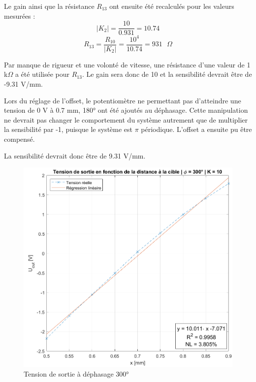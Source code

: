 Le gain ainsi que la résistance $R_{13}$ ont ensuite été recalculés pour les valeurs mesurées :
\begin{equation*}
    |K_2| = \frac{10}{0.931} = 10.74
\end{equation*}
\begin{equation*}
    R_{13} = \frac{R_{10}}{|K_2|}= \frac{10^4}{10.74}= 931\text{ }\Omega
\end{equation*}

Par manque de rigueur et une volonté de vitesse, une résistance d'une valeur de 1 k$\Omega$
a été utilisée pour $R_{13}$. Le gain sera donc de 10 et la sensibilité devrait être de -9.31 V/mm.
\vspace{0.2cm}

Lors du réglage de l'offset, le potentiomètre ne permettant pas d'atteindre une tension de 0 V à
0.7 mm, 180° ont été ajoutés au déphasage. Cette manipulation ne devrait pas changer le comportement
du système autrement que de multiplier la sensibilité par -1, puisque le système est $\pi$ périodique.
L'offset a ensuite pu être compensé.
\vspace{0.2cm}

La sensibilité devrait donc être de 9.31 V/mm.

\begin{figure}[H]
    \centering
    \includegraphics[width=15cm]{Images/Seance5/uout3.png}
    \caption{Tension de sortie à déphasage 300°}
    \label{fig:uout3}
\end{figure}

